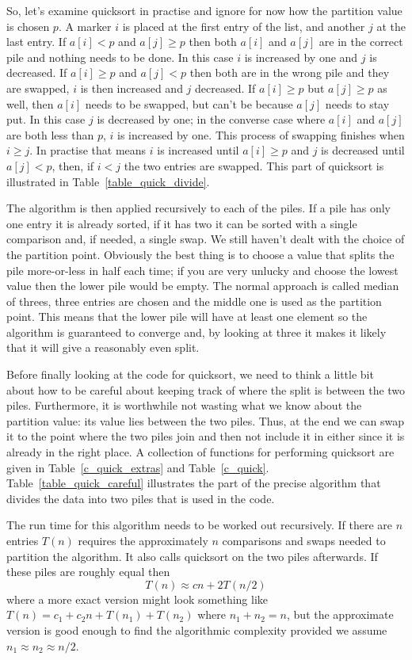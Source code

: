 \documentclass[11pt,a4paper]{scrartcl}
\begin{document}
So, let's examine quicksort in practise and ignore for now how the
partition value is chosen $p$. A marker $i$ is placed at the first
entry of the list, and another $j$ at the last entry. If $a[i]<p$ and
$a[j]\ge p$ then both $a[i]$ and $a[j]$ are in the correct pile and
nothing needs to be done. In this case $i$ is increased by one and $j$
is decreased. If $a[i]\ge p$ and $a[j]<p$ then both are in the wrong
pile and they are swapped, $i$ is then increased and $j$ decreased. If
$a[i]\ge p$ but $a[j]\ge p$ as well, then $a[i]$ needs to be swapped,
but can't be because $a[j]$ needs to stay put. In this case $j$ is
decreased by one; in the converse case where $a[i]$ and $a[j]$ are
both less than $p$, $i$ is increased by one. This process of swapping
finishes when $i\ge j$. In practise that means $i$ is increased until
$a[i]\ge p$ and $j$ is decreased until $a[j]<p$, then, if $i<j$ the
two entries are swapped. This part of quicksort is illustrated in
Table~\ref{table_quick_divide}.

The algorithm is then applied recursively to each of the piles. If a
pile has only one entry it is already sorted, if it has two it can be
sorted with a single comparison and, if needed, a single swap. We still
haven't dealt with the choice of the partition point. Obviously the
best thing is to choose a value that splits the pile more-or-less in
half each time; if you are very unlucky and choose the lowest value
then the lower pile would be empty. The normal approach is called
median of threes, three entries are chosen and the middle one is used
as the partition point. This means that the lower pile will have at
least one element so the algorithm is guaranteed to converge and, by
looking at three it makes it likely that it will give a reasonably
even split.

Before finally looking at the code for quicksort, we need to think a
little bit about how to be careful about keeping track of where the split
is between the two piles. Furthermore, it is worthwhile not wasting what
we know about the partition value: its value lies between the two
piles. Thus, at the end we can swap it to the point where the two
piles join and then not include it in either since it is already in
the right place. A collection of functions for performing quicksort
are given in Table~\ref{c_quick_extras} and
Table~\ref{c_quick}. Table~\ref{table_quick_careful} illustrates
the part of the precise algorithm that divides the data into two piles
that is used in the code.

The run time for this algorithm needs to be worked out recursively. If
there are $n$ entries $T(n)$ requires the approximately $n$
comparisons and swaps needed to partition the algorithm. It also calls
quicksort on the two piles afterwards. If these piles are roughly
equal then
\begin{equation}
T(n)\approx cn+2T(n/2)
\end{equation}
where a more exact version might look something like $T(n)=c_1+c_2n +
T(n_1)+T(n_2)$ where $n_1+n_2=n$, but the approximate version is good
enough to find the algorithmic complexity provided we assume
$n_1\approx n_2\approx n/2$. 
\end{document}
